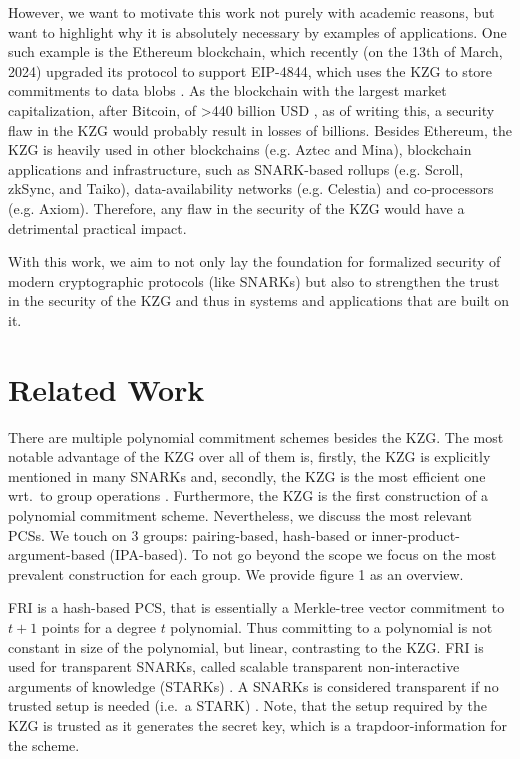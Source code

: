 However, we want to motivate this work not purely with academic reasons, but want to highlight why it is absolutely necessary by examples of applications. One such example is the Ethereum blockchain, which recently (on the 13th of March, 2024) upgraded its protocol to support EIP-4844, which uses the KZG to store commitments to data blobs \parencite{EIP4844}. As the blockchain with the largest market capitalization, after Bitcoin, of >440 billion USD \parencite*{CoinMarketCap}, as of writing this, a security flaw in the KZG would probably result in losses of billions. Besides Ethereum, the KZG is heavily used in other blockchains (e.g. Aztec\parencite*{Aztec} and Mina\parencite*{Mina}), blockchain applications and infrastructure, such as SNARK-based rollups (e.g. Scroll\parencite*{Scroll}, zkSync\parencite*{zksync}, and Taiko\parencite*{Taiko}), data-availability networks (e.g. Celestia\parencite*{Celestia}) and co-processors (e.g. Axiom\parencite*{Axiom}). Therefore, any flaw in the security of the KZG would have a detrimental practical impact. 

With this work, we aim to not only lay the foundation for formalized security of modern cryptographic protocols (like SNARKs) but also to strengthen the trust in the security of the KZG and thus in systems and applications that are built on it.

\section*{Related Work}
There are multiple polynomial commitment schemes besides the KZG. The most notable advantage of the KZG over all of them is, firstly, the KZG is explicitly mentioned in many SNARKs \parencite{plonk,sonic,marlin,halo,nova} and, secondly, the KZG is the most efficient one wrt.\ to group operations \parencite{thalerbook,boneh_shoup, KZG}. 
Furthermore, the KZG is the first construction of a polynomial commitment scheme. Nevertheless, we discuss the most relevant PCSs. We touch on 3 groups: pairing-based, hash-based or inner-product-argument-based (IPA-based). To not go beyond the scope we focus on the most prevalent construction for each group. We provide figure 1 as an overview. %

FRI \parencite{FRI} is a hash-based PCS, that is essentially a Merkle-tree vector commitment to $t+1$ points for a degree $t$ polynomial. Thus committing to a polynomial is not constant in size of the polynomial, but linear, contrasting to the KZG. FRI is used for transparent SNARKs, called scalable transparent non-interactive arguments of knowledge (STARKs) \parencite{STARK}. A SNARKs is considered transparent if no trusted setup is needed  (i.e.\ a STARK) \parencite{STARK}. Note, that the setup required by the KZG is trusted as it generates the secret key, which is a trapdoor-information for the scheme.

